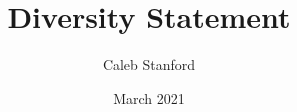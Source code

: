 \documentclass{article}
\title{Diversity Statement}
\author{Caleb Stanford}
\date{March 2021}
\begin{document}
\maketitle{}
\end{document}

